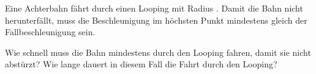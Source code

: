 Eine Achterbahn fährt durch einen Looping mit Radius \rlO. Damit die Bahn nicht herunterfällt, muss die Beschleunigung im höchsten Punkt mindestens gleich der Fallbeschleunigung sein.
\begin{abcliste}
\abc Wie schnell muss die Bahn mindestens durch den Looping fahren, damit sie nicht abstürzt?
\abc Wie lange dauert in diesem Fall die Fahrt durch den Looping?
\end{abcliste}
